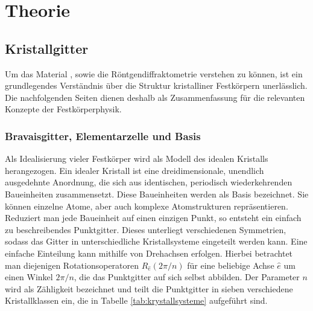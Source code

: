 \section{Theorie}\label{sec:theorie}

\subsection{Kristallgitter}\label{subsec:kristallgitter}
Um das Material \heo, sowie die Röntgendiffraktometrie verstehen zu können, ist ein grundlegendes Verständnis
über die Struktur kristalliner Festkörpern unerlässlich.
Die nachfolgenden Seiten dienen deshalb als Zusammenfassung für die relevanten Konzepte der Festkörperphysik.

\subsubsection{Bravaisgitter, Elementarzelle und Basis}
Als Idealisierung vieler Festkörper wird als Modell des idealen Kristalls herangezogen.
Ein idealer Kristall ist eine dreidimensionale, unendlich ausgedehnte Anordnung, die sich aus identischen, periodisch
wiederkehrenden Baueinheiten zusammensetzt.
Diese Baueinheiten werden als Basis bezeichnet.
Sie können einzelne Atome, aber auch komplexe Atomstrukturen repräsentieren.
Reduziert man jede Baueinheit auf einen einzigen Punkt, so entsteht ein einfach zu beschreibendes Punktgitter.
\autocite[49]{Hunklinger}
Dieses unterliegt verschiedenen Symmetrien, sodass das Gitter in unterschiedliche Kristallsysteme eingeteilt werden
kann.
Eine einfache Einteilung kann mithilfe von Drehachsen erfolgen.
Hierbei betrachtet man diejenigen Rotationsoperatoren $R_{\hat{e}}(2\pi / n)$ für eine beliebige Achse $\hat{e}$ um
einen Winkel $2 \pi /n$, die das Punktgitter auf sich selbst abbilden.
Der Parameter $n$ wird als Zähligkeit bezeichnet und teilt die Punktgitter in sieben verschiedene Kristallklassen ein,
die in Tabelle \cref{tab:krystallsysteme} aufgeführt sind.
\autocite[53]{Hunklinger}
